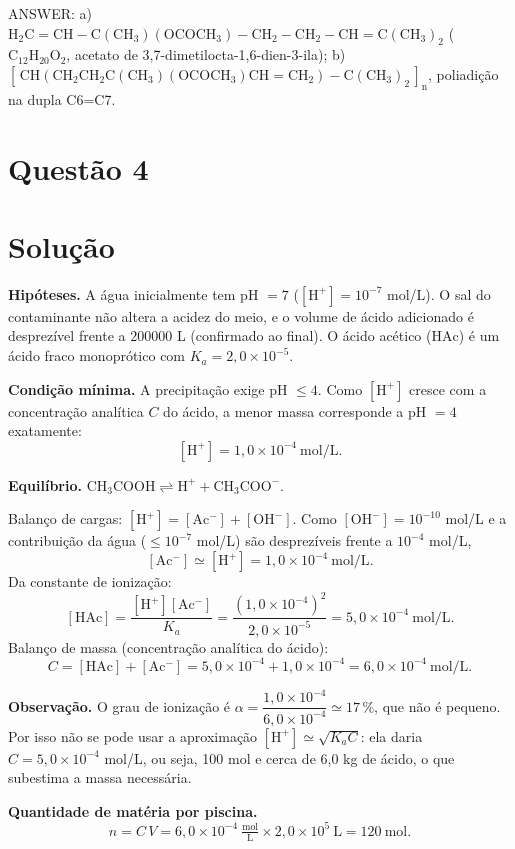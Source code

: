 \documentclass{article}%
\begin{document}
ANSWER: a) $\mathrm{H_2C{=}CH{-}C(CH_3)(OCOCH_3){-}CH_2{-}CH_2{-}CH{=}C(CH_3)_2}$ ($\mathrm{C_{12}H_{20}O_2}$, acetato de 3,7-dimetilocta-1,6-dien-3-ila); b) $\mathrm{\left[\,CH(CH_2CH_2C(CH_3)(OCOCH_3)CH{=}CH_2){-}C(CH_3)_2\,\right]_n}$, poliadição na dupla C6=C7.%
\newpage%
\section*{Questão 4}

\section*{Solução}

\textbf{Hipóteses.} A água inicialmente tem pH $=7$ ($[\mathrm{H^+}]=10^{-7}$ mol/L). O sal do contaminante não altera a acidez do meio, e o volume de ácido adicionado é desprezível frente a $200000$ L (confirmado ao final). O ácido acético ($\mathrm{HAc}$) é um ácido fraco monoprótico com $K_a=2{,}0\times10^{-5}$.

\textbf{Condição mínima.} A precipitação exige pH $\le 4$. Como $[\mathrm{H^+}]$ cresce com a concentração analítica $C$ do ácido, a menor massa corresponde a pH $=4$ exatamente:
\[
[\mathrm{H^+}] = 1{,}0\times10^{-4}\ \text{mol/L}.
\]

\textbf{Equilíbrio.} $\mathrm{CH_3COOH \rightleftharpoons H^+ + CH_3COO^-}$.

Balanço de cargas: $[\mathrm{H^+}]=[\mathrm{Ac^-}]+[\mathrm{OH^-}]$. Como $[\mathrm{OH^-}]=10^{-10}$ mol/L e a contribuição da água ($\le 10^{-7}$ mol/L) são desprezíveis frente a $10^{-4}$ mol/L,
\[
[\mathrm{Ac^-}] \simeq [\mathrm{H^+}] = 1{,}0\times10^{-4}\ \text{mol/L}.
\]
Da constante de ionização:
\[
[\mathrm{HAc}] = \frac{[\mathrm{H^+}][\mathrm{Ac^-}]}{K_a} = \frac{(1{,}0\times10^{-4})^2}{2{,}0\times10^{-5}} = 5{,}0\times10^{-4}\ \text{mol/L}.
\]
Balanço de massa (concentração analítica do ácido):
\[
C = [\mathrm{HAc}]+[\mathrm{Ac^-}] = 5{,}0\times10^{-4}+1{,}0\times10^{-4} = 6{,}0\times10^{-4}\ \text{mol/L}.
\]

\textbf{Observação.} O grau de ionização é $\alpha = \dfrac{1{,}0\times10^{-4}}{6{,}0\times10^{-4}} \simeq 17\,\%$, que não é pequeno. Por isso não se pode usar a aproximação $[\mathrm{H^+}]\simeq\sqrt{K_a C}$: ela daria $C=5{,}0\times10^{-4}$ mol/L, ou seja, 100 mol e cerca de 6,0 kg de ácido, o que subestima a massa necessária.

\textbf{Quantidade de matéria por piscina.}
\[
n = C\,V = 6{,}0\times10^{-4}\ \tfrac{\text{mol}}{\text{L}} \times 2{,}0\times10^{5}\ \text{L} = 120\ \text{mol}.
\]
\end{document}
